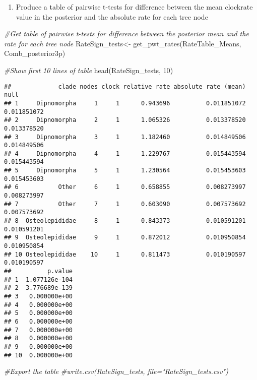 \documentclass[
]{article}
\newenvironment{Shaded}{\begin{snugshade}}{\end{snugshade}}
\newcommand{\CommentTok}[1]{\textcolor[rgb]{0.56,0.35,0.01}{\textit{#1}}}
\newcommand{\DecValTok}[1]{\textcolor[rgb]{0.00,0.00,0.81}{#1}}
\newcommand{\FunctionTok}[1]{\textcolor[rgb]{0.00,0.00,0.00}{#1}}
\newcommand{\NormalTok}[1]{#1}
\newcommand{\OtherTok}[1]{\textcolor[rgb]{0.56,0.35,0.01}{#1}}
\providecommand{\tightlist}{%
  \setlength{\itemsep}{0pt}\setlength{\parskip}{0pt}}
\begin{document}
\begin{enumerate}
\def\labelenumi{\arabic{enumi}.}
\setcounter{enumi}{2}
\tightlist
\item
  Produce a table of pairwise t-tests for difference between the mean
  clockrate value in the posterior and the absolute rate for each tree
  node
\end{enumerate}

\begin{Shaded}
\begin{Highlighting}[]
\CommentTok{\#Get table of pairwise t{-}tests for difference between the posterior mean and the rate for each tree node}
\NormalTok{RateSign\_tests}\OtherTok{\textless{}{-}} \FunctionTok{get\_pwt\_rates}\NormalTok{(RateTable\_Means, Comb\_posterior3p)}

\CommentTok{\#Show first 10 lines of table}
\FunctionTok{head}\NormalTok{(RateSign\_tests, }\DecValTok{10}\NormalTok{)}
\end{Highlighting}
\end{Shaded}

\begin{verbatim}
##             clade nodes clock relative rate absolute rate (mean)        null
## 1     Dipnomorpha     1     1      0.943696          0.011851072 0.011851072
## 2     Dipnomorpha     2     1      1.065326          0.013378520 0.013378520
## 3     Dipnomorpha     3     1      1.182460          0.014849506 0.014849506
## 4     Dipnomorpha     4     1      1.229767          0.015443594 0.015443594
## 5     Dipnomorpha     5     1      1.230564          0.015453603 0.015453603
## 6           Other     6     1      0.658855          0.008273997 0.008273997
## 7           Other     7     1      0.603090          0.007573692 0.007573692
## 8  Osteolepididae     8     1      0.843373          0.010591201 0.010591201
## 9  Osteolepididae     9     1      0.872012          0.010950854 0.010950854
## 10 Osteolepididae    10     1      0.811473          0.010190597 0.010190597
##          p.value
## 1  1.077126e-104
## 2  3.776689e-139
## 3   0.000000e+00
## 4   0.000000e+00
## 5   0.000000e+00
## 6   0.000000e+00
## 7   0.000000e+00
## 8   0.000000e+00
## 9   0.000000e+00
## 10  0.000000e+00
\end{verbatim}

\begin{Shaded}
\begin{Highlighting}[]
\CommentTok{\#Export the table}
\CommentTok{\#write.csv(RateSign\_tests, file="RateSign\_tests.csv")}
\end{Highlighting}
\end{Shaded}
\end{document}
